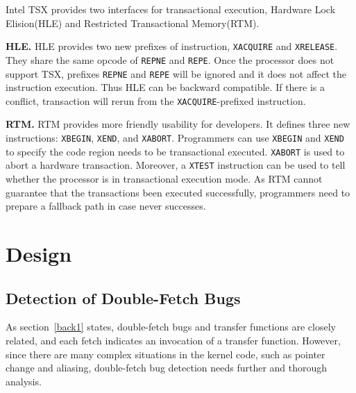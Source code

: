 \documentclass[10pt]{llncs}
\begin{document}
Intel TSX provides two interfaces for transactional execution, Hardware Lock Elision(HLE) and Restricted Transactional Memory(RTM).

\textbf{HLE.} HLE provides two new prefixes of instruction, \verb:XACQUIRE: and \verb:XRELEASE:. They share the same opcode of \verb:REPNE: and \verb:REPE:. Once the processor does not support TSX, prefixes \verb:REPNE: and \verb:REPE: will be ignored and it does not affect the instruction execution. Thus HLE can be backward compatible. If there is a conflict, transaction will rerun from the \verb:XACQUIRE:-prefixed instruction.

\textbf{RTM.} RTM provides more friendly usability for developers. It defines three new instructions: \verb:XBEGIN:, \verb:XEND:, and \verb:XABORT:. Programmers can use \verb:XBEGIN: and \verb:XEND: to specify the code region needs to be transactional executed. \verb:XABORT: is used to abort a hardware transaction. Moreover, a \verb:XTEST: instruction can be used to tell whether the processor is in transactional execution mode. As RTM cannot guarantee that the transactions been executed successfully, programmers need to prepare a fallback path in case never successes.

\section{Design}%
\label{design}

\subsection{Detection of Double-Fetch Bugs}
\label{design1}
As section~\ref{back1} states, double-fetch bugs and transfer functions are closely related, 
and each fetch indicates an invocation of a transfer function. However, since there are many 
complex situations in the kernel code, such as pointer change and aliasing, double-fetch bug 
detection needs further and thorough analysis.

\end{document}
